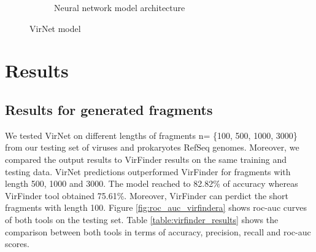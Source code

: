 \documentclass[conference]{IEEEtran}
\begin{document}
\begin{figure}
\begin{subfigure}{0.4\textwidth}
		\caption{Neural network model architecture} 
		\label{fig:model_diagram}
	\end{subfigure}
	\caption{VirNet model} 
	\label{fig:model_arch}
\end{figure}

\section{Results}

\subsection{Results for generated fragments}
We tested VirNet on different lengths of fragments n= \{100, 500, 1000, 3000\} from our testing set of viruses and prokaryotes RefSeq genomes. Moreover, we compared the output results to VirFinder results on the same training and testing data. VirNet predictions outperformed VirFinder for fragments with length 500, 1000 and 3000. The model reached to 82.82\% of accuracy whereas VirFinder tool obtained 75.61\%. Moreover, VirFinder can perdict the short fragments with length 100. Figure \ref{fig:roc_auc_virfindera} shows roc-auc curves of both tools on the testing set. Table \ref{table:virfinder_results} shows the comparison between both tools in terms of accuracy, precision, recall and roc-auc scores.

\end{document}
